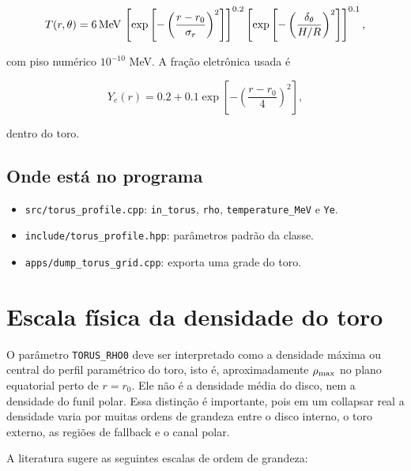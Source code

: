 \documentclass[11pt,a4paper]{article}
\begin{document}
\begin{equation}
  T(r,\theta) =
  6\,{\rm MeV}\,
  \left[
  \exp\left[-\left(\frac{r-r_0}{\sigma_r}\right)^2\right]
  \right]^{0.2}
  \left[
  \exp\left[-\left(\frac{\delta_\theta}{H/R}\right)^2\right]
  \right]^{0.1},
\end{equation}

com piso numérico $10^{-10}$ MeV. A fração eletrônica usada é

\begin{equation}
  Y_e(r) = 0.2 + 0.1
  \exp\left[-\left(\frac{r-r_0}{4}\right)^2\right],
\end{equation}

dentro do toro.

\subsection*{Onde está no programa}

\begin{itemize}
  \item \texttt{src/torus\_profile.cpp}: \texttt{in\_torus},
  \texttt{rho}, \texttt{temperature\_MeV} e \texttt{Ye}.
  \item \texttt{include/torus\_profile.hpp}: parâmetros padrão da classe.
  \item \texttt{apps/dump\_torus\_grid.cpp}: exporta uma grade do toro.
\end{itemize}

\section{Escala física da densidade do toro}

O parâmetro \texttt{TORUS\_RHO0} deve ser interpretado como a densidade
máxima ou central do perfil paramétrico do toro, isto é, aproximadamente
$\rho_{\rm max}$ no plano equatorial perto de $r=r_0$. Ele não é a densidade
média do disco, nem a densidade do funil polar. Essa distinção é importante,
pois em um collapsar real a densidade varia por muitas ordens de grandeza
entre o disco interno, o toro externo, as regiões de fallback e o canal polar.

A literatura sugere as seguintes escalas de ordem de grandeza:
\end{document}
